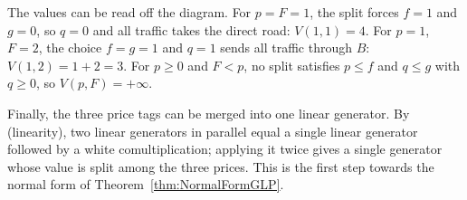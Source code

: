 The values can be read off the diagram. For $p=F=1$, the split forces
$f=1$ and $g=0$, so $q=0$ and all traffic takes the direct road:
$V(1,1)=4$. For $p=1$, $F=2$, the choice $f=g=1$ and $q=1$ sends all traffic
through $B$: $V(1,2)=1+2=3$. For $p\ge0$ and $F<p$, no split satisfies
$p\le f$ and $q\le g$ with $q\ge0$, so $V(p,F)=+\infty$.

Finally, the three price tags can be merged into one linear generator.
By (linearity), two linear generators in parallel equal a single linear
generator followed by a white comultiplication; applying it twice gives a
single generator whose value is split among the three prices. This is the
first step towards the normal form of Theorem~\ref{thm:NormalFormGLP}.
